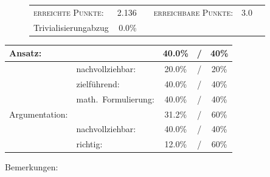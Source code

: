 \documentclass{article}
\begin{document}
\vspace{-0.5cm}
\begin{figure}[h!]
\begin{tabular}{lrcrcr}
\textsc{erreichte Punkte:} &2.136& & \textsc{erreichbare Punkte:} &3.0\\
\small Trivialisierungabzug  & 0.0\% & & &
\end{tabular}
\end{figure}
\vspace{-0.1cm}
\begin{minipage}[t]{0.6\textwidth}
\flushleft
\begin{tabular}{l|lccc}
Ansatz:& &40.0\%&/&40\%\\\hline
&nachvollziehbar:&20.0\%&/&20\%\\
&zielf{\"u}hrend:&40.0\%&/&40\%\\
&math.~Formulierung:& 40.0\%&/&40\%\\\hline\hline
Argumentation:& &31.2\%&/&60\%\\\hline
&nachvollziehbar:&40.0\%&/&40\%\\
&richtig:&12.0\%&/&60\%\\\hline
\end{tabular}
\end{minipage}
\hfill
\begin{minipage}[t]{0.4\textwidth}
	\vspace{-1.75cm}
	Bemerkungen:\\\vspace*{0.2cm}
	\underline{\hspace{0.75\textwidth}}\\\vspace*{0.2cm}
	\underline{\hspace{0.75\textwidth}}
	\\\vspace*{0.2cm}
	\underline{\hspace{0.75\textwidth}}
	\\\vspace*{0.2cm}
	\underline{\hspace{0.75\textwidth}}
	\\\vspace*{0.2cm}
	\underline{\hspace{0.75\textwidth}}
\end{minipage}
	\vspace{0.5cm}\clearpage
\end{document}
